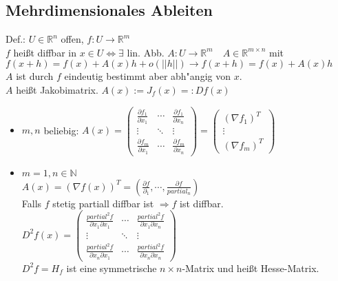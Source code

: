 \documentclass[10pt,a4paper^, twocolumn]{article}
\newcommand{\menge}{\mathbb} %
\begin{document}
\subsection{Mehrdimensionales Ableiten}
	Def.: $U \in \menge{R}^n$ offen, \quad $f:U \to \menge{R}^m$ \\
	$f$ heißt diffbar in $x \in U \Leftrightarrow \exists$ lin. Abb. $A: U \to \menge{R}^m \quad A \in \menge{R}^{m \times n}$ mit
	$f(x+h) = f(x) + A(x)h + o(||h||) \rightarrow f(x+h) = f(x) + A(x)h$ \\
	$A$ ist durch $f$ eindeutig bestimmt aber abh"angig von $x$.\\ $A$ heißt Jakobimatrix. $A(x) := J_f(x) =: Df(x)$
	\begin{itemize}
	\item $m,n$ beliebig: $A(x) = \begin{pmatrix}
			\frac{\partial f_1}{\partial x_1} 	& \cdots 	& \frac{\partial f_1}{\partial x_n} \\
			\vdots					& \ddots	& \vdots	\\
			\frac{\partial f_m}{\partial x_1}	& \cdots	& \frac{\partial f_m}{\partial x_n}
		\end{pmatrix} = \begin{pmatrix}
			(\nabla f_1)^T \\
			\vdots \\
			(\nabla f_m)^T
		\end{pmatrix}$
	\item $m = 1, n \in \menge{N}$ \\
		$A(x) = (\nabla f(x))^T = \left ( \frac{\partial f}{\partial_1}, \cdots, \frac{\partial f}{partial_n} \right )$ \\
		Falls $f$ stetig partiall diffbar ist $\Rightarrow f$ ist diffbar. \\
		$D^2 f(x) = \begin{pmatrix}
			\frac{partial^2 f}{\partial x_1 \partial x_1} 	& \cdots	& \frac{partial^2 f}{\partial x_1 \partial x_n} \\
			\vdots						& \ddots	& \vdots	\\
			\frac{partial^2 f}{\partial x_n \partial x_1} 	& \cdots	& \frac{partial^2 f}{\partial x_n \partial x_n}
		\end{pmatrix}$ \\
		$D^2 f = H_f$ ist eine symmetrische $n \times n$-Matrix und heißt Hesse-Matrix.
	\end{itemize}
\end{document}
